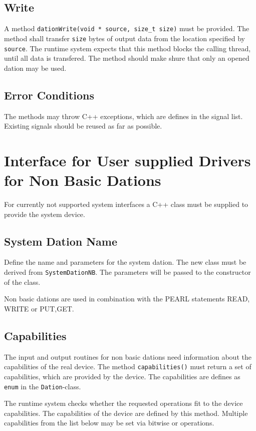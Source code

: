 \subsection{Write}
A method \verb|dationWrite(void * source, size_t size)|
must be provided. The method shall transfer \verb|size| bytes of
output data from the location specified by \verb|source|.
The runtime system expects that this method blocks the calling thread,
until all data is transfered.
The method should make shure that only an opened dation may be used.

\subsection{Error Conditions}
The methods may throw C++ exceptions, which are defines in the signal list.
Existing signals should be reused as far as possible.

\section{Interface for User supplied Drivers for Non Basic Dations}
For currently not supported system interfaces a C++ class must be supplied to 
provide the system device.

\subsection{System Dation Name}
Define the name and parameters for the system dation.
The new class must be derived from \verb|SystemDationNB|.
The parameters will be passed to the constructor of the class.

Non basic dations are used in combination with the PEARL statements READ, WRITE
or PUT,GET. 

\subsection{Capabilities}
The input and output routines for non basic dations 
need information about the capabilities of the
real device. The method \verb|capabilities()| must return a set of
capabilities, which are provided by the device. The capabilities are
defines as \verb|enum| in the \verb|Dation|-class.

The runtime system checks whether the requested operations fit to the 
device capabilities. The capabilities of the device are defined by this
method. Multiple capabilities from the list below may be set via bitwise
or operations.

